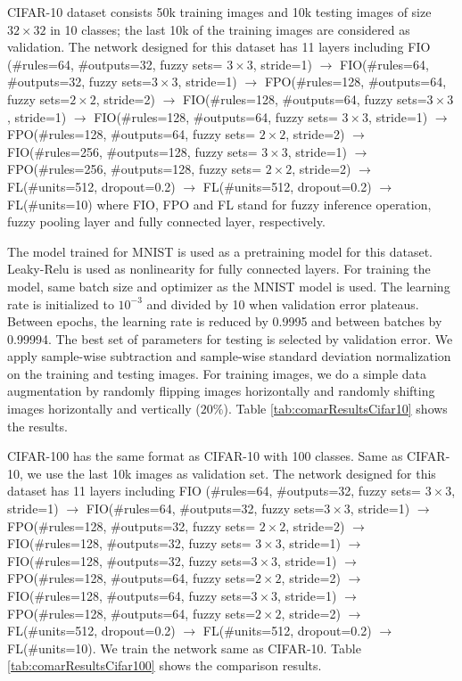 \documentclass{article}
\begin{document}
CIFAR-10 dataset  \cite{krizhevsky2009learning}consists 50k training images and 10k testing images of size $32 \times 32$ in 10 classes; the last 10k of the training images are considered as validation. The network designed for this dataset has 11 layers including FIO (\#rules=64, \#outputs=32, fuzzy sets= $3 \times 3$, stride=1) $\rightarrow$ FIO(\#rules=64, \#outputs=32, fuzzy sets=$3 \times 3$, stride=1)  $\rightarrow$ FPO(\#rules=128, \#outputs=64, fuzzy sets=$2 \times 2$, stride=2) $\rightarrow$ FIO(\#rules=128, \#outputs=64, fuzzy sets=$3 \times 3$, stride=1) $\rightarrow$ FIO(\#rules=128, \#outputs=64, fuzzy sets= $3 \times 3$, stride=1) $\rightarrow$  FPO(\#rules=128, \#outputs=64, fuzzy sets= $2 \times 2$, stride=2) $\rightarrow$ FIO(\#rules=256, \#outputs=128, fuzzy sets= $3 \times 3$, stride=1) $\rightarrow$ FPO(\#rules=256, \#outputs=128, fuzzy sets= $2 \times 2$, stride=2) $\rightarrow$ FL(\#units=512, dropout=0.2) $\rightarrow$ FL(\#units=512, dropout=0.2) $\rightarrow$ FL(\#units=10) where FIO, FPO and FL stand for fuzzy inference operation, fuzzy pooling layer and fully connected layer, respectively.

The model trained for MNIST is used as a pretraining model for this dataset. Leaky-Relu is used as nonlinearity for fully connected layers. For training the model, same batch size and optimizer as the MNIST model is used. The learning rate is initialized to $10^{-3}$ and divided by 10 when validation error plateaus. Between epochs, the learning rate is reduced by 0.9995 and between batches by 0.99994. The best set of parameters for testing is selected by validation error. We apply sample-wise subtraction and sample-wise standard deviation normalization on the training and testing images. For training images, we do a simple data augmentation by randomly flipping images horizontally and randomly shifting images horizontally and vertically ($20\%$). Table \ref{tab:comarResultsCifar10} shows the results.

CIFAR-100 has the same format as CIFAR-10 with 100 classes. Same as CIFAR-10, we use the last 10k images as validation set. The network designed for this dataset has 11 layers including FIO (\#rules=64, \#outputs=32, fuzzy sets= $3 \times 3$, stride=1) $\rightarrow$ FIO(\#rules=64, \#outputs=32, fuzzy sets=$3 \times 3$, stride=1) $\rightarrow$ FPO(\#rules=128, \#outputs=32, fuzzy sets= $2 \times 2$, stride=2) $\rightarrow$ FIO(\#rules=128, \#outputs=32, fuzzy sets= $3 \times 3$, stride=1) $\rightarrow$ FIO(\#rules=128, \#outputs=32, fuzzy sets=$3 \times 3$, stride=1) $\rightarrow$ FPO(\#rules=128, \#outputs=64, fuzzy sets=$2 \times 2$, stride=2) $\rightarrow$ FIO(\#rules=128, \#outputs=64, fuzzy sets=$3 \times 3$, stride=1)  $\rightarrow$ FPO(\#rules=128, \#outputs=64, fuzzy sets=$2 \times 2$, stride=2) $\rightarrow$ FL(\#units=512, dropout=0.2) $\rightarrow$ FL(\#units=512, dropout=0.2) $\rightarrow$ FL(\#units=10). We train the network same as CIFAR-10. Table \ref{tab:comarResultsCifar100} shows the comparison results.
\end{document}
